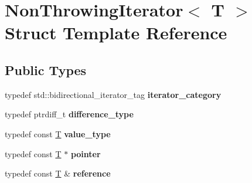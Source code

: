 \hypertarget{struct_non_throwing_iterator}{}\section{Non\+Throwing\+Iterator$<$ T $>$ Struct Template Reference}
\label{struct_non_throwing_iterator}
\subsection*{Public Types}
\begin{DoxyCompactItemize}
\item 
\mbox{\label{struct_non_throwing_iterator_a20d751aa7fa4cf174b57f5ca1e197bad}} 
typedef std\+::bidirectional\+\_\+iterator\+\_\+tag {\bfseries iterator\+\_\+category}
\item 
\mbox{\label{struct_non_throwing_iterator_a99a6053676ae7f90b84dc1cea5eaa9e3}} 
typedef ptrdiff\+\_\+t {\bfseries difference\+\_\+type}
\item 
\mbox{\label{struct_non_throwing_iterator_adb96eb0e42c508d63df14949ab062c8c}} 
typedef const \mbox{\hyperlink{struct_t}{T}} {\bfseries value\+\_\+type}
\item 
\mbox{\label{struct_non_throwing_iterator_aca141cad4888689fc7d3b3116a897c60}} 
typedef const \mbox{\hyperlink{struct_t}{T}} $\ast$ {\bfseries pointer}
\item 
\mbox{\label{struct_non_throwing_iterator_a42d73e10da9ad3826f213b0691ae1944}} 
typedef const \mbox{\hyperlink{struct_t}{T}} \& {\bfseries reference}
\end{DoxyCompactItemize}
